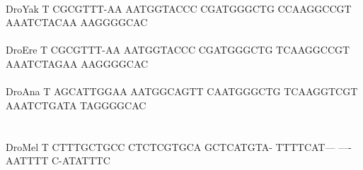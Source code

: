 \documentclass[11pt,twoside,reqno,a4paper]{article}
\begin{document}
{\hspace*{7\charwidth}\hspace*{1\charwidth}\hspace*{1\charwidth}\hspace*{1\charwidth}\hspace*{1\charwidth}\hspace*{1\charwidth}\hspace*{1\charwidth}\\
DroYak	T	CGCGTTT-AA	AATGGTACCC	CGATGGGCTG	CCAAGGCCGT	AAATCTACAA	AAGGGGCAC\\
\hspace*{7\charwidth}\hspace*{1\charwidth}\hspace*{1\charwidth}\hspace*{1\charwidth}\hspace*{1\charwidth}\hspace*{1\charwidth}\hspace*{1\charwidth}\\
DroEre	T	CGCGTTT-AA	AATGGTACCC	CGATGGGCTG	TCAAGGCCGT	AAATCTAGAA	AAGGGGCAC\\
\hspace*{7\charwidth}\hspace*{1\charwidth}\hspace*{1\charwidth}\hspace*{1\charwidth}\hspace*{1\charwidth}\hspace*{1\charwidth}\hspace*{1\charwidth}\\
DroAna	T	AGCATTGGAA	AATGGCAGTT	CAATGGGCTG	TCAAGGTCGT	AAATCTGATA	TAGGGGCAC\\
\hspace*{7\charwidth}\hspace*{1\charwidth}\hspace*{1\charwidth}\hspace*{1\charwidth}\hspace*{1\charwidth}\hspace*{1\charwidth}\hspace*{1\charwidth}\\
\\
DroMel	T	CTTTGCTGCC	CTCTCGTGCA	GCTCATGTA-	TTTTCAT---	----AATTTT	C-ATATTTC\\
\hspace*{7\charwidth}\hspace*{1\charwidth}\hspace*{1\charwidth}\hspace*{1\charwidth}\hspace*{1\charwidth}\hspace*{1\charwidth}\hspace*{1\charwidth}\\
}
\end{document}
